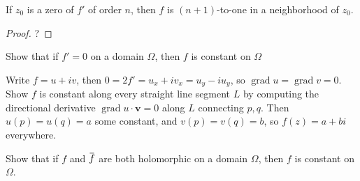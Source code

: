 \begin{proposition}

If \(z_0\) is a zero of \(f'\) of order \(n\), then \(f\) is
\((n+1)\)-to-one in a neighborhood of \(z_0\).

\end{proposition}

\begin{proof}

?

\end{proof}


\begin{exercise}

Show that if \(f' = 0\) on a domain \(\Omega\), then \(f\) is constant
on \(\Omega\)

\end{exercise}

\begin{solution}

Write \(f = u + iv\), then \(0 = 2 f' = u_x + iv_x = u_y - iu_y\), so
\(\operatorname{grad}u = \operatorname{grad}v = 0\). Show \(f\) is
constant along every straight line segment \(L\) by computing the
directional derivative \(\operatorname{grad}u \cdot \mathbf{v} = 0\)
along \(L\) connecting \(p, q\). Then \(u(p) = u(q) = a\) some constant,
and \(v(p) = v(q) = b\), so \(f(z) = a+bi\) everywhere.

\end{solution}

\begin{exercise}

Show that if \(f\) and
\(\mkern 1.5mu\overline{\mkern-1.5muf\mkern-1.5mu}\mkern 1.5mu\) are
both holomorphic on a domain \(\Omega\), then \(f\) is constant on
\(\Omega\).

\end{exercise}

